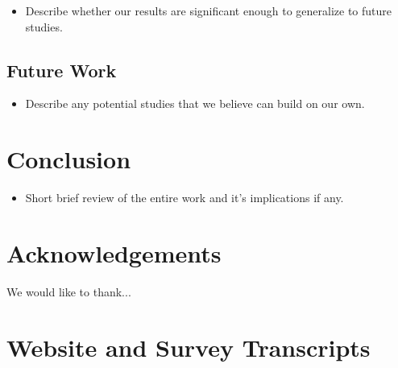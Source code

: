 \documentclass{sig-alternate-05-2015}
\begin{document}
\begin{itemize}
    \item Describe whether our results are significant enough to generalize to future studies.
\end{itemize}

\subsection{Future Work}

\begin{itemize}
    \item Describe any potential studies that we believe can build on our own.
\end{itemize}

\section{Conclusion}
\begin{itemize}
    \item Short brief review of the entire work and it's implications if any.
\end{itemize}

\section*{Acknowledgements}
We would like to thank...




\appendix
\section{Website and Survey Transcripts}
\end{document}
